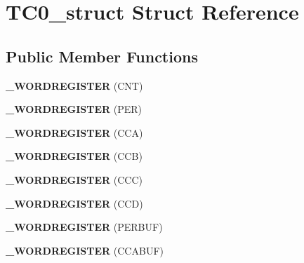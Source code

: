 \hypertarget{struct_t_c0__struct}{}\section{T\+C0\+\_\+struct Struct Reference}
\label{struct_t_c0__struct}
\subsection*{Public Member Functions}
\begin{DoxyCompactItemize}
\item 
{\bfseries \+\_\+\+W\+O\+R\+D\+R\+E\+G\+I\+S\+T\+ER} (C\+NT)\hypertarget{struct_t_c0__struct_af7fcbdf56d92a360e29a8d36b8f97c73}{}\label{struct_t_c0__struct_af7fcbdf56d92a360e29a8d36b8f97c73}

\item 
{\bfseries \+\_\+\+W\+O\+R\+D\+R\+E\+G\+I\+S\+T\+ER} (P\+ER)\hypertarget{struct_t_c0__struct_add36c78fc3b8edd15bf4b5f8a4cdadf9}{}\label{struct_t_c0__struct_add36c78fc3b8edd15bf4b5f8a4cdadf9}

\item 
{\bfseries \+\_\+\+W\+O\+R\+D\+R\+E\+G\+I\+S\+T\+ER} (C\+CA)\hypertarget{struct_t_c0__struct_a62a6a03d186bf5f51686aa879fa71c18}{}\label{struct_t_c0__struct_a62a6a03d186bf5f51686aa879fa71c18}

\item 
{\bfseries \+\_\+\+W\+O\+R\+D\+R\+E\+G\+I\+S\+T\+ER} (C\+CB)\hypertarget{struct_t_c0__struct_a6e6973dd4fbcf148fc5eee2fc42bc8e3}{}\label{struct_t_c0__struct_a6e6973dd4fbcf148fc5eee2fc42bc8e3}

\item 
{\bfseries \+\_\+\+W\+O\+R\+D\+R\+E\+G\+I\+S\+T\+ER} (C\+CC)\hypertarget{struct_t_c0__struct_a6e70bb96cba0bff07ec799bf56ee59d7}{}\label{struct_t_c0__struct_a6e70bb96cba0bff07ec799bf56ee59d7}

\item 
{\bfseries \+\_\+\+W\+O\+R\+D\+R\+E\+G\+I\+S\+T\+ER} (C\+CD)\hypertarget{struct_t_c0__struct_a1e471d3541fbea967a5a2f7dcdd944dc}{}\label{struct_t_c0__struct_a1e471d3541fbea967a5a2f7dcdd944dc}

\item 
{\bfseries \+\_\+\+W\+O\+R\+D\+R\+E\+G\+I\+S\+T\+ER} (P\+E\+R\+B\+UF)\hypertarget{struct_t_c0__struct_af35c694d01ee46e9d2a1c0fa47124656}{}\label{struct_t_c0__struct_af35c694d01ee46e9d2a1c0fa47124656}

\item 
{\bfseries \+\_\+\+W\+O\+R\+D\+R\+E\+G\+I\+S\+T\+ER} (C\+C\+A\+B\+UF)\hypertarget{struct_t_c0__struct_a616c3cabab9c6e4cdc5616db202e2db3}{}\label{struct_t_c0__struct_a616c3cabab9c6e4cdc5616db202e2db3}


\end{DoxyCompactItemize}
